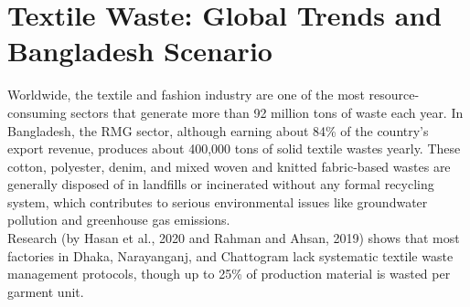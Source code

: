 \section{Textile Waste: Global Trends and Bangladesh Scenario}

Worldwide, the textile and fashion industry are one of the most resource-consuming sectors that generate more than 92 million tons of waste each year. In Bangladesh, the RMG sector, although earning about 84\% of the country's export revenue, produces about 400,000 tons of solid textile wastes yearly. These cotton, polyester, denim, and mixed woven and knitted fabric-based wastes are generally disposed of in landfills or incinerated without any formal recycling system, which contributes to serious environmental issues like groundwater pollution and greenhouse gas emissions. \\

\noindent Research (by Hasan et al., 2020 and Rahman and Ahsan, 2019) shows that most factories in Dhaka, Narayanganj, and Chattogram lack systematic textile waste management protocols, though up to 25\% of production material is wasted per garment unit.